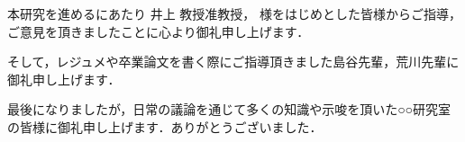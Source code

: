 \theacknowledgments


\begin{comment}
    \textblockcolour{lime}
    \begin{textblock}{12}(6, 6)
        謝辞はなくてもよい。
        
        謝辞・参考文献・ソースコードなどの付録は本文に含まれない。
    \end{textblock}
    
    \begin{textblock}{12}(6, 12)
        論文全体で句読点の形式を統一する。
    
        このサンプルでは謝辞の句読点が他の章のそれと異なっている。
    
        どの句読点形式で執筆をするか指導教員に確認すること。
    \end{textblock}
\end{comment}

本研究を進めるにあたり 井上 教授准教授， 様をはじめとした皆様からご指導，ご意見を頂きましたことに心より御礼申し上げます．

そして，レジュメや卒業論文を書く際にご指導頂きました島谷先輩，荒川先輩に御礼申し上げます．

最後になりましたが，日常の議論を通じて多くの知識や示唆を頂いた○○研究室の皆様に御礼申し上げます．ありがとうございました．
